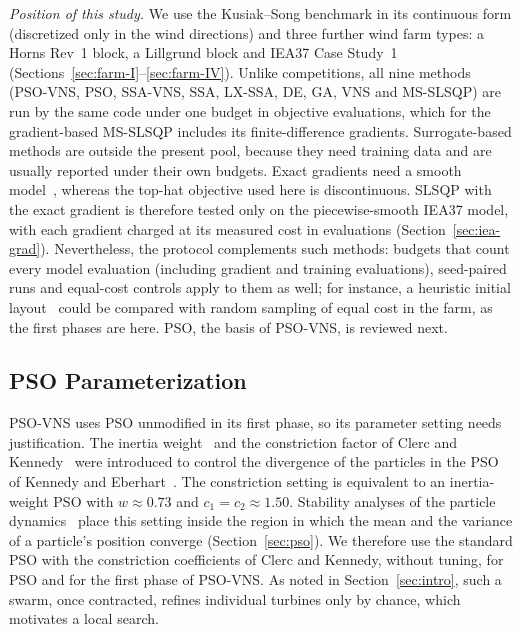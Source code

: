 \emph{Position of this study.} We use the Kusiak--Song benchmark in its continuous form (discretized only in the wind directions) and three further wind farm types: a Horns Rev~1 block, a Lillgrund block and IEA37 Case Study~1 (Sections~\ref{sec:farm-I}--\ref{sec:farm-IV}). Unlike competitions, all nine methods (PSO-VNS, PSO, SSA-VNS, SSA, LX-SSA, DE, GA, VNS and MS-SLSQP) are run by the same code under one budget in objective evaluations, which for the gradient-based MS-SLSQP includes its finite-difference gradients. Surrogate-based methods are outside the present pool, because they need training data and are usually reported under their own budgets. Exact gradients need a smooth model~\cite{Guirguis2016,Thomas2023}, whereas the top-hat objective used here is discontinuous. SLSQP with the exact gradient is therefore tested only on the piecewise-smooth IEA37 model, with each gradient charged at its measured cost in evaluations (Section~\ref{sec:iea-grad}). Nevertheless, the protocol complements such methods: budgets that count every model evaluation (including gradient and training evaluations), seed-paired runs and equal-cost controls apply to them as well; for instance, a heuristic initial layout~\cite{Rodrigues2024,CriadoRisco2024} could be compared with random sampling of equal cost in the farm, as the first phases are here. PSO, the basis of PSO-VNS, is reviewed next.

\subsection{PSO Parameterization}
\label{sec:related-pso}
PSO-VNS uses PSO unmodified in its first phase, so its parameter setting needs justification. The inertia weight~\cite{Shi1998} and the constriction factor of Clerc and Kennedy~\cite{Clerc2002} were introduced to control the divergence of the particles in the PSO of Kennedy and Eberhart~\cite{Kennedy1995}. The constriction setting is equivalent to an inertia-weight PSO with $w\approx0.73$ and $c_1=c_2\approx1.50$. Stability analyses of the particle dynamics~\cite{Poli2009,Cleghorn2018,Bonyadi2017} place this setting inside the region in which the mean and the variance of a particle's position converge (Section~\ref{sec:pso}). We therefore use the standard PSO with the constriction coefficients of Clerc and Kennedy, without tuning, for PSO and for the first phase of PSO-VNS. As noted in Section~\ref{sec:intro}, such a swarm, once contracted, refines individual turbines only by chance, which motivates a local search.

